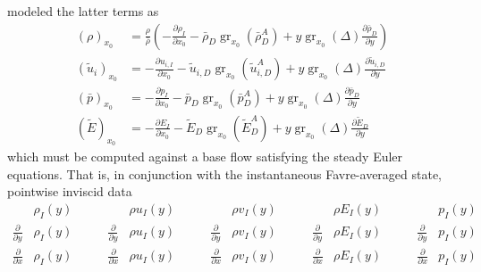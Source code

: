modeled the latter terms as
\begin{subequations}
\label{eq:spatiotemporal_prim_model}
\begin{align}
\left(\rho\right)_{x_0} &=
    \frac{\rho}{\bar{\rho}} \left(
        - \frac{\partial\!{\rho}_I}{\partial\!x_0}
        - \bar{\rho}_D \operatorname{gr}_{x_0}\!\left({\bar{\rho}_D^A}\right)
        + y \operatorname{gr}_{x_0}\!\left(\Delta\right)
          \frac{\partial\!\bar{\rho}_D}{\partial\!y}
    \right)
\\
\left(\tilde{u}_i\right)_{x_0} &=
    - \frac{\partial\!{u}_{i,I}}{\partial\!x_0}
    - \tilde{u}_{i,D} \operatorname{gr}_{x_0}\!\left(\tilde{u}_{i,D}^A\right)
    + y \operatorname{gr}_{x_0}\!\left(\Delta\right)
      \frac{\partial\!\tilde{u}_{i,D}}{\partial\!y}
\\
\label{eq:sp_barp_model}
\left(\bar{p}\right)_{x_0} &=
    - \frac{\partial\!{p}_I}{\partial\!x_0}
    - \bar{p}_D \operatorname{gr}_{x_0}\!\left(\bar{p}_{D}^A\right)
    + y \operatorname{gr}_{x_0}\!\left(\Delta\right)
      \frac{\partial\!\bar{p}_D}{\partial\!y}
\\
\left(\tilde{E}\right)_{x_0} &=
    - \frac{\partial\!{E}_I}{\partial\!x_0}
    - \tilde{E}_D \operatorname{gr}_{x_0}\!\left(\tilde{E}_{D}^A\right)
    + y \operatorname{gr}_{x_0}\!\left(\Delta\right)
      \frac{\partial\!\tilde{E}_D}{\partial\!y}
\end{align}
\end{subequations}
which must be computed against a base flow satisfying the steady Euler
equations.  That is, in conjunction with the instantaneous Favre-averaged state,
pointwise inviscid data
\begin{equation}
\label{eq:spatiotemporal_cons_baseflow}
\begin{alignedat}{5}
    &\rho_I\!\left(y\right)                                &\qquad &\rho                                u_I\!\left(y\right)  &\qquad  &\rho                                v_I\!\left(y\right)  &\qquad  &\rho                                E_I\!\left(y\right)  &\qquad  &p_I\!\left(y\right)                               \\
    \frac{\partial\!}{\partial\!y}&\rho_I\!\left(y\right)  &\qquad \frac{\partial\!}{\partial\!y}&\rho  u_I\!\left(y\right)  &\qquad  \frac{\partial\!}{\partial\!y}&\rho  v_I\!\left(y\right)  &\qquad  \frac{\partial\!}{\partial\!y}&\rho  E_I\!\left(y\right)  &\qquad  \frac{\partial\!}{\partial\!y}&p_I\!\left(y\right) \\
    \frac{\partial\!}{\partial\!x}&\rho_I\!\left(y\right)  &\qquad \frac{\partial\!}{\partial\!x}&\rho  u_I\!\left(y\right)  &\qquad  \frac{\partial\!}{\partial\!x}&\rho  v_I\!\left(y\right)  &\qquad  \frac{\partial\!}{\partial\!x}&\rho  E_I\!\left(y\right)  &\qquad  \frac{\partial\!}{\partial\!x}&p_I\!\left(y\right)
\end{alignedat}
\end{equation}
